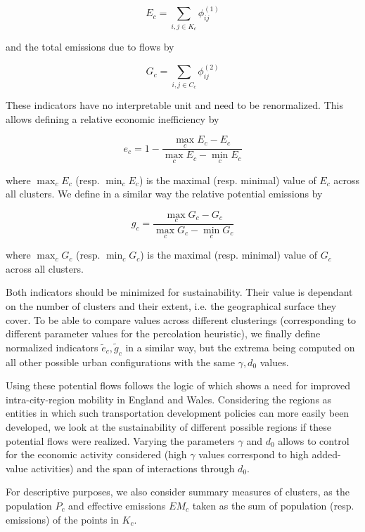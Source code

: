 \documentclass{jimis-en}
\begin{document}
\begin{equation}
E_c = \sum_{i,j \in K_c} \phi_{ij}^{(1)}
\end{equation}

and the total emissions due to flows by

\begin{equation}
G_c = \sum_{i,j \in C_c} \phi_{ij}^{(2)}
\end{equation}

These indicators have no interpretable unit and need to be renormalized. This allows defining a relative economic inefficiency by 

\begin{equation}
e_c = 1 - \frac{\max_c E_c - E_c}{\max_c E_c - \min_c E_c}
\end{equation}

where $\max_c E_c$ (resp. $\min_c E_c$) is the maximal (resp. minimal) value of $E_c$ across all clusters. We define in a similar way the relative potential emissions by

\begin{equation}
g_c = \frac{\max_c G_c - G_c}{\max_c G_c - \min_c G_c}
\end{equation}

where $\max_c G_c$ (resp. $\min_c G_c$) is the maximal (resp. minimal) value of $G_c$ across all clusters.

Both indicators should be minimized for sustainability. Their value is dependant on the number of clusters and their extent, i.e. the geographical surface they cover. To be able to compare values across different clusterings (corresponding to different parameter values for the percolation heuristic), we finally define normalized indicators $\tilde{e}_c,\tilde{g}_c$ in a similar way, but the extrema being computed on all other possible urban configurations with the same $\gamma,d_0$ values.

Using these potential flows follows the logic of \cite{arbabi2019development} which shows a need for improved intra-city-region mobility in England and Wales. Considering the regions as entities in which such transportation development policies can more easily been developed, we look at the sustainability of different possible regions if these potential flows were realized. Varying the parameters $\gamma$ and $d_0$ allows to control for the economic activity considered (high $\gamma$ values correspond to high added-value activities) and the span of interactions through $d_0$.

For descriptive purposes, we also consider summary measures of clusters, as the population $P_c$ and effective emissions $EM_c$ taken as the sum of population (resp. emissions) of the points in $K_c$.
\end{document}
